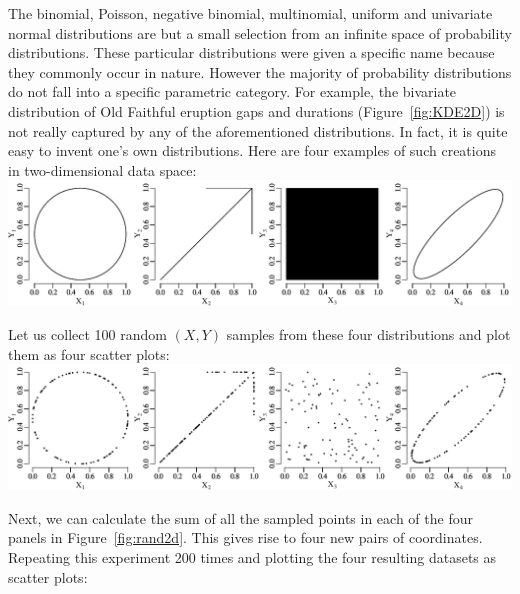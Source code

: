 The binomial, Poisson, negative binomial, multinomial, uniform and
univariate normal distributions are but a small selection from an
infinite space of probability distributions. These particular
distributions were given a specific name because they commonly occur
in nature.  However the majority of probability distributions do not
fall into a specific parametric category.  For example, the bivariate
distribution of Old Faithful eruption gaps and durations
(Figure~\ref{fig:KDE2D}) is not really captured by any of the
aforementioned distributions. In fact, it is quite easy to invent
one's own distributions. Here are four examples of such creations in
two-dimensional data space:\\

\noindent\includegraphics[width=\textwidth]{../figures/pop2d.pdf}
\begingroup {}
\label{fig:pop2d}
\endgroup

Let us collect 100 random $(X,Y)$ samples from these four
distributions and plot them as four scatter plots:\\

\noindent\includegraphics[width=\textwidth]{../figures/rand2d.pdf}
\begingroup {}
\label{fig:rand2d}
\endgroup

Next, we can calculate the sum of all the sampled points in each of
the four panels in Figure~\ref{fig:rand2d}. This gives rise to four
new pairs of coordinates. Repeating this experiment 200 times and
plotting the four resulting datasets as scatter plots:\\

